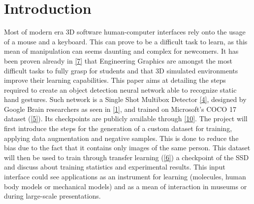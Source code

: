 \documentclass[a4paper, 12pt]{article}
\begin{document}
\section{Introduction}
\begin{flushleft}
Most of modern era 3D software human-computer interfaces rely onto the usage of a mouse and a keyboard. This can prove to be a difficult task to learn, as this mean of manipulation can seems daunting and complex for newcomers.\linebreak
It has been proven already in \hyperref[Ref4]{[7]} that Engineering Graphics are amongst the most difficult tasks to fully grasp for students and that 3D simulated environments improve their learning capabilities.\linebreak
This paper aims at detailing the steps required to create an object detection neural network able to recognize static hand gestures. Such network is a Single Shot Multibox Detector \hyperref[Ref1]{[4]}, designed by Google Brain researchers as seen in \hyperref[RefSSD]{[1]}, and trained on Microsoft's COCO 17 dataset (\hyperref[Ref2]{[5]}). Its checkpoints are publicly available through \hyperref[Ref10]{[10]}.\linebreak
The project will first introduce the steps for the generation of a custom dataset for training, applying data augmentation and negative samples. This is done to reduce the bias due to the fact that it contains only images of the same person. This dataset will then be used to train through transfer learning (\hyperref[Ref3]{[6]}) a checkpoint of the SSD and discuss about training statistics and experimental results.\linebreak
This input interface could see applications as an instrument for learning (molecules, human body models or mechanical models) and as a mean of interaction in museums or during large-scale presentations.
\end{flushleft}
\end{document}
